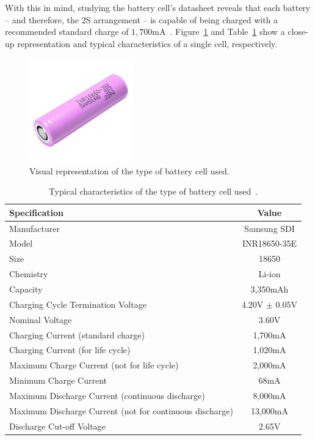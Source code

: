 With this in mind, studying the battery cell's datasheet reveals that each battery -- and therefore, the 2S arrangement -- is capable of being charged with a recommended standard charge of $1,700$mA~\cite{INR18650-35E}.
Figure~\ref{fig:battery2S} and Table~\ref{tab:battery2S} show a close-up representation and typical characteristics of a single cell, respectively.

\begin{figure}[h]
	\centering
	\includegraphics[width=0.4\textwidth]{Chapters/Figures/chapter3/bateria-li-ion-mr-18650-3-6v-3500mah-samsung-inr18650-35e.jpg}
	\caption{Visual representation of the type of battery cell used.}
	\label{fig:battery2S}
\end{figure}

\begingroup
\begin{table}[h]
	\caption{Typical characteristics of the type of battery cell used~\cite{INR18650-35E}.}
	\label{tab:battery2S}
	\centering%
	\begin{tabular}{lc}
        \toprule
        \textbf{Specification} & \textbf{Value} \\
        \midrule
        Manufacturer & Samsung SDI \\
        \midrule
        Model & INR18650-35E \\
        \midrule
		Size & 18650 \\
		\midrule
		Chemistry & Li-ion \\
		\midrule
		Capacity & 3,350mAh \\
        \midrule
		Charging Cycle Termination Voltage & 4.20V $\pm$ 0.05V \\
		\midrule
		Nominal Voltage & 3.60V \\
        \midrule
		Charging Current (standard charge) & 1,700mA\\
		\midrule
		Charging Current (for life cycle) & 1,020mA\\
		\midrule
		Maximum Charge Current (not for life cycle) & 2,000mA \\
		\midrule
		Minimum Charge Current & 68mA \\
		\midrule
		Maximum Discharge Current (continuous discharge) & 8,000mA \\
		\midrule
		Maximum Discharge Current (not for continuous discharge) & 13,000mA \\
		\midrule
		Discharge Cut-off Voltage & 2.65V \\
        \bottomrule
    \end{tabular}
\end{table}
\endgroup

